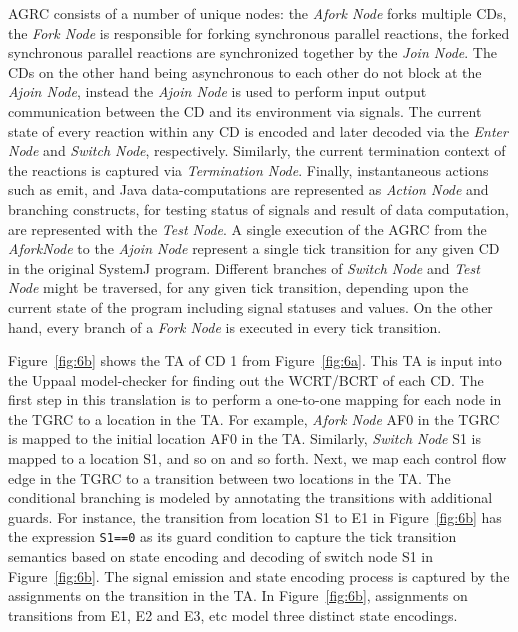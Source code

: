 AGRC consists of a number of unique nodes: the \textit{Afork Node} forks
multiple CDs, the \textit{Fork Node} is responsible for forking
synchronous parallel reactions, the forked synchronous parallel
reactions are synchronized together by the \textit{Join Node}. The CDs
on the other hand being asynchronous to each other do not block at the
\textit{Ajoin Node}, instead the \textit{Ajoin Node} is used to perform
input output communication between the CD and its environment via
signals. The current state of every reaction within any CD is encoded
and later decoded via the \textit{Enter Node} and \textit{Switch Node},
respectively. Similarly, the current termination context of the
reactions is captured via \textit{Termination Node}. Finally,
instantaneous actions such as emit, and Java data-computations are
represented as \textit{Action Node} and branching constructs, for
testing status of signals and result of data computation, are
represented with the \textit{Test Node}. A single execution of the AGRC
from the \textit{AforkNode} to the \textit{Ajoin Node} represent a
single tick transition for any given CD in the original SystemJ program.
Different branches of \textit{Switch Node} and \textit{Test Node} might
be traversed, for any given tick transition, depending upon the current
state of the program including signal statuses and values. On the other
hand, every branch of a \textit{Fork Node} is executed in every tick
transition. %

Figure~\ref{fig:6b} shows the TA of CD 1 from Figure~\ref{fig:6a}. This
TA is input into the Uppaal model-checker for finding out the WCRT/BCRT
of each CD. The first step in this translation is to perform a
one-to-one mapping for each node in the TGRC to a location in the TA.
For example, \textit{Afork Node} AF0 in the TGRC is mapped to the
initial location AF0 in the TA. Similarly, \textit{Switch Node} S1 is
mapped to a location S1, and so on and so forth. Next, we map each
control flow edge in the TGRC to a transition between two locations in
the TA. The conditional branching is modeled by annotating the
transitions with additional guards. For instance, the transition from
location S1 to E1 in Figure~\ref{fig:6b} has the expression
\texttt{S1==0} as its guard condition to capture the tick transition
semantics based on state encoding and decoding of switch node S1 in
Figure~\ref{fig:6b}. The signal emission and state encoding process is
captured by the assignments on the transition in the TA. In
Figure~\ref{fig:6b}, assignments on transitions from E1, E2 and E3, etc
model three distinct state encodings.

